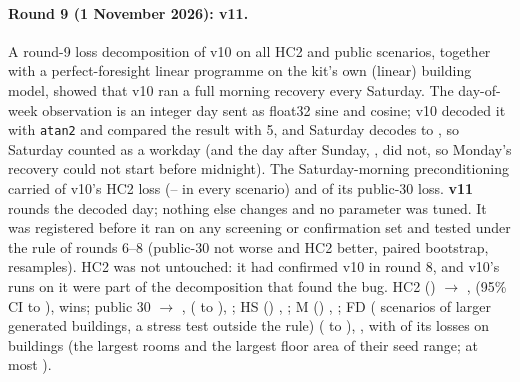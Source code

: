\documentclass{article}
\begin{document}
\paragraph{Round 9 (1 November 2026): v11.}
A round-9 loss decomposition of v10 on all \RNineNDecomp{} HC2 and public scenarios, together with a perfect-foresight
linear programme on the kit's own (linear) building model, showed that v10 ran a full morning recovery every Saturday.
The day-of-week observation is an integer day sent as float32 sine and cosine; v10 decoded it with \texttt{atan2} and
compared the result with 5, and Saturday decodes to \RNineSatDecode, so Saturday counted as a workday (and the day after
Sunday, \RNineSunDecode, did not, so Monday's recovery could not start before midnight). The Saturday-morning
preconditioning carried \RNineSatShareHCTwo{} of v10's HC2 loss (\RNineSatShareHCTwoMin--\RNineSatShareHCTwoMax{} in
every scenario) and \RNineSatSharePub{} of its public-30 loss. \textbf{v11} rounds the decoded day; nothing else changes
and no parameter was tuned. It was registered before it ran on any screening or confirmation set and tested under the
rule of rounds 6--8 (public-30 not worse and HC2 better, paired bootstrap, \RNineNBoot{} resamples). HC2 was not
untouched: it had confirmed v10 in round 8, and v10's runs on it were part of the decomposition that found the bug.
HC2 (\RNineConfHarshCTwoN) \RNineConfHarshCTwoRef{} $\to$ \RNineConfHarshCTwoCand, \RNineConfHarshCTwoRel{} (95\% CI
\RNineConfHarshCTwoRelLo{} to \RNineConfHarshCTwoRelHi), \RNineConfHarshCTwoWins{} wins; public 30 \RNineConfPubRef{}
$\to$ \RNineConfPubCand, \RNineConfPubRel{} (\RNineConfPubRelLo{} to \RNineConfPubRelHi), \RNineConfPubWins; HS
(\RNineConfHarshSN) \RNineConfHarshSRel, \RNineConfHarshSWins; M (\RNineConfMinnN) \RNineConfMinnRel,
\RNineConfMinnWins; FD (\RNineConfFreshDefN{} scenarios of \RNineFDNBuild{} larger generated buildings, a stress test
outside the rule) \RNineConfFreshDefRel{} (\RNineConfFreshDefRelLo{} to \RNineConfFreshDefRelHi),
\RNineConfFreshDefWins, with \RNineFDTopTwoLosses{} of its \RNineConfFreshDefLosses{} losses on buildings
\RNineFDTopTwoBuild{} (the largest rooms and the largest floor area of their seed range; at most
\RNineConfFreshDefWorstRel).
\end{document}
